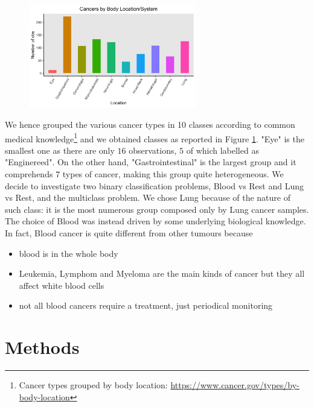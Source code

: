 \documentclass[a4paper,11pt, oneside]{article}  %
\begin{document}
\begin{figure}
	\includegraphics[width=0.65\textwidth]{plot1.png}
	\label{fig1}
\end{figure}

We hence grouped the various cancer types in 10 classes according to common medical knowledge\footnote{Cancer types grouped by body location: \url{https://www.cancer.gov/types/by-body-location}} and we obtained classes as reported in Figure \ref{fig1}.  "Eye" is the smallest one as there are only $16$ observations, $5$ of which labelled as "Enginereed". On the other hand, "Gastrointestinal" is the largest group and it comprehends $7$ types of cancer,  making this group quite heterogeneous.
We decide to investigate two binary classification problems,  Blood vs Rest and Lung vs Rest, and the multiclass problem. We chose Lung because of the nature of such class: it is the most numerous group composed only by Lung cancer samples. The choice of Blood was instead driven by some underlying biological knowledge. In fact,  Blood cancer is quite different from other tumours because
\begin{itemize}
	\item blood is in the whole body
	\item Leukemia, Lymphom and Myeloma are the main kinds of cancer but they all affect white blood cells
	\item not all blood cancers require a treatment, just periodical monitoring
\end{itemize} 


\section{Methods}
\end{document}
